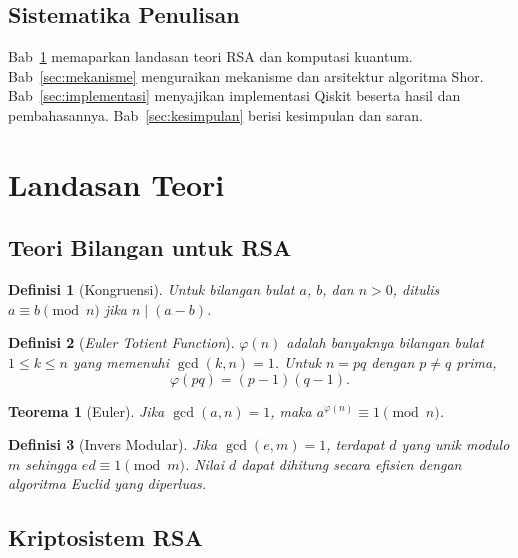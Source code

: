 \documentclass[11pt,a4paper]{article}
\newtheorem{teorema}{Teorema}
\newtheorem{definisi}{Definisi}
\begin{document}
\subsection{Sistematika Penulisan}
Bab~\ref{sec:teori} memaparkan landasan teori RSA dan komputasi kuantum.
Bab~\ref{sec:mekanisme} menguraikan mekanisme dan arsitektur algoritma Shor.
Bab~\ref{sec:implementasi} menyajikan implementasi Qiskit beserta hasil dan
pembahasannya. Bab~\ref{sec:kesimpulan} berisi kesimpulan dan saran.

\section{Landasan Teori}\label{sec:teori}

\subsection{Teori Bilangan untuk RSA}

\begin{definisi}[Kongruensi]
Untuk bilangan bulat $a$, $b$, dan $n > 0$, ditulis $a \equiv b \pmod n$
jika $n \mid (a - b)$.
\end{definisi}

\begin{definisi}[\emph{Euler Totient Function}]
$\varphi(n)$ adalah banyaknya bilangan bulat $1 \le k \le n$ yang memenuhi
$\gcd(k, n) = 1$. Untuk $n = pq$ dengan $p \ne q$ prima,
\begin{equation}
  \varphi(pq) = (p-1)(q-1).
\end{equation}
\end{definisi}

\begin{teorema}[Euler]
Jika $\gcd(a, n) = 1$, maka $a^{\varphi(n)} \equiv 1 \pmod n$.
\end{teorema}

\begin{definisi}[Invers Modular]
Jika $\gcd(e, m) = 1$, terdapat $d$ yang unik modulo $m$ sehingga
$ed \equiv 1 \pmod m$. Nilai $d$ dapat dihitung secara efisien dengan
algoritma Euclid yang diperluas.
\end{definisi}

\subsection{Kriptosistem RSA}
\end{document}
